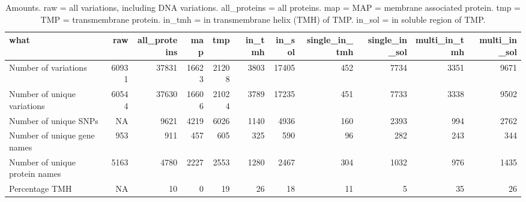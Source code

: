 \begin{table}

\caption{\label{tab:ncbi_counts}Amounts. raw = all variations, including DNA variations. all\_proteins = all proteins. map = MAP = membrane associated protein. tmp = TMP = transmembrane protein. in\_tmh = in transmembrane helix (TMH) of TMP. in\_sol = in soluble region of TMP. }
\centering
\begin{tabular}[t]{l|r|r|r|r|r|r|r|r|r|r}
\hline
what & raw & all\_proteins & map & tmp & in\_tmh & in\_sol & single\_in\_tmh & single\_in\_sol & multi\_in\_tmh & multi\_in\_sol\\
\hline
Number of variations & 60931 & 37831 & 16623 & 21208 & 3803 & 17405 & 452 & 7734 & 3351 & 9671\\
\hline
Number of unique variations & 60544 & 37630 & 16606 & 21024 & 3789 & 17235 & 451 & 7733 & 3338 & 9502\\
\hline
Number of unique SNPs & NA & 9621 & 4219 & 6026 & 1140 & 4936 & 160 & 2393 & 994 & 2762\\
\hline
Number of unique gene names & 953 & 911 & 457 & 605 & 325 & 590 & 96 & 282 & 243 & 344\\
\hline
Number of unique protein names & 5163 & 4780 & 2227 & 2553 & 1280 & 2467 & 304 & 1032 & 976 & 1435\\
\hline
Percentage TMH & NA & 10 & 0 & 19 & 26 & 18 & 11 & 5 & 35 & 26\\
\hline
\end{tabular}
\end{table}